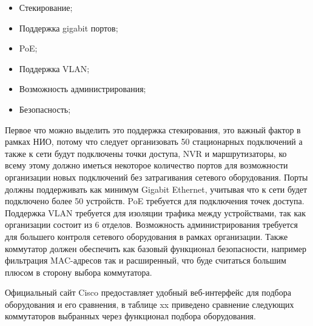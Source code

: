 \begin{itemize}
    \item Стекирование;
    \item Поддержка gigabit портов;
    \item PoE;    
    \item Поддержка VLAN;    
    \item Возможность администрирования;    
    \item Безопасность;
\end{itemize}

Первое что можно выделить это поддержка стекирования, это важный фактор в рамках НИО, потому что следует организовать 50 стационарных подключений
а также к сети будут подключены точки доступа, NVR и маршрутизаторы, ко всему этому должно иметься некоторое количество портов для возможности
организации новых подключений без затрагивания сетевого оборудования.
Порты должны поддерживать как минимум Gigabit Ethernet, учитывая что к сети будет подключено более 50 устройств. PoE требуется для подключения точек доступа.
Поддержка VLAN требуется для изоляции трафика между устройствами, так как организации состоит из 6 отделов.
Возможность администрирования требуется для большего контроля сетевого оборудования в рамках организации. 
Также коммутатор должен обеспечить как базовый функционал безопасности, например фильтрация MAC-адресов так и расширенный, что буде считаться большим плюсом в сторону
выбора коммутатора.

Официальный сайт Cisco предоставляет удобный веб-интерфейс для подбора оборудования и его сравнения, в таблице xx приведено сравнение следующих коммутаторов 
выбранных через функционал подбора оборудования.


